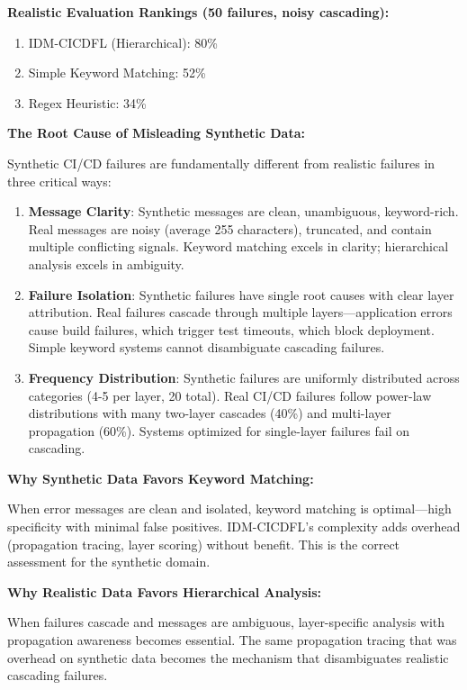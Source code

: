 \documentclass[11pt]{article}
\begin{document}
\textbf{Realistic Evaluation Rankings (50 failures, noisy cascading):}
\begin{enumerate}
    \item IDM-CICDFL (Hierarchical): 80\%
    \item Simple Keyword Matching: 52\%
    \item Regex Heuristic: 34\%
\end{enumerate}

\textbf{The Root Cause of Misleading Synthetic Data:}

Synthetic CI/CD failures are fundamentally different from realistic failures in three critical ways:

\begin{enumerate}
    \item \textbf{Message Clarity}: Synthetic messages are clean, unambiguous, keyword-rich. Real messages are noisy (average 255 characters), truncated, and contain multiple conflicting signals. Keyword matching excels in clarity; hierarchical analysis excels in ambiguity.

    \item \textbf{Failure Isolation}: Synthetic failures have single root causes with clear layer attribution. Real failures cascade through multiple layers—application errors cause build failures, which trigger test timeouts, which block deployment. Simple keyword systems cannot disambiguate cascading failures.

    \item \textbf{Frequency Distribution}: Synthetic failures are uniformly distributed across categories (4-5 per layer, 20 total). Real CI/CD failures follow power-law distributions with many two-layer cascades (40\%) and multi-layer propagation (60\%). Systems optimized for single-layer failures fail on cascading.
\end{enumerate}

\textbf{Why Synthetic Data Favors Keyword Matching:}

When error messages are clean and isolated, keyword matching is optimal—high specificity with minimal false positives. IDM-CICDFL's complexity adds overhead (propagation tracing, layer scoring) without benefit. This is the correct assessment for the synthetic domain.

\textbf{Why Realistic Data Favors Hierarchical Analysis:}

When failures cascade and messages are ambiguous, layer-specific analysis with propagation awareness becomes essential. The same propagation tracing that was overhead on synthetic data becomes the mechanism that disambiguates realistic cascading failures.
\end{document}
